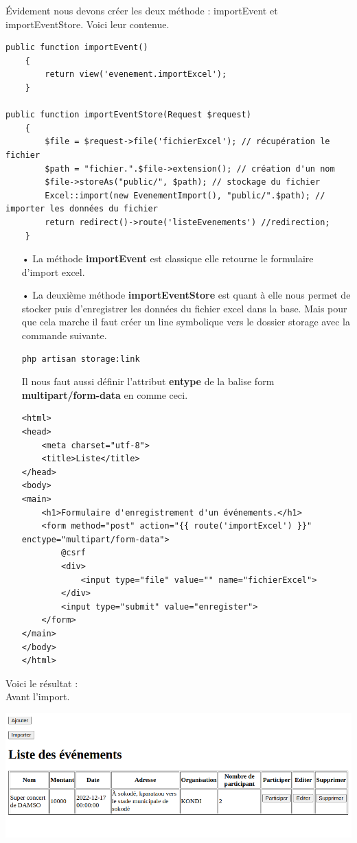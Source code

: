 \documentclass[12pt,a4paper]{article}
\begin{document}
Évidement nous devons créer les deux méthode : importEvent et importEventStore.
Voici leur contenue.
\begin{verbatim}
public function importEvent()
    {
        return view('evenement.importExcel');
    }

public function importEventStore(Request $request)
    {
        $file = $request->file('fichierExcel'); // récupération le fichier
        $path = "fichier.".$file->extension(); // création d'un nom 
        $file->storeAs("public/", $path); // stockage du fichier
        Excel::import(new EvenementImport(), "public/".$path); // importer les données du fichier
        return redirect()->route('listeEvenements') //redirection;
    }
\end{verbatim}
\begin{itemize}
\item[•] La méthode \textbf{importEvent} est classique elle retourne le formulaire
d'import excel.
\item[•] La deuxième méthode \textbf{importEventStore} est quant à elle nous permet de stocker puis d’enregistrer les données du fichier excel dans la base. Mais pour que cela marche il faut créer un line symbolique vers le dossier storage avec la commande suivante.
\begin{verbatim}
php artisan storage:link
\end{verbatim}
Il nous faut aussi définir l'attribut \textbf{entype} de la balise form \textbf{multipart/form-data} en comme ceci.
\begin{verbatim}
<html>
<head>
    <meta charset="utf-8">
    <title>Liste</title>
</head>
<body>
<main>
    <h1>Formulaire d'enregistrement d'un événements.</h1>
    <form method="post" action="{{ route('importExcel') }}" enctype="multipart/form-data">
        @csrf
        <div>
            <input type="file" value="" name="fichierExcel">
        </div>
        <input type="submit" value="enregister">
    </form>
</main>
</body>
</html>
\end{verbatim}
\end{itemize}
Voici le résultat : \\
Avant l'import.
\begin{center}
\includegraphics[scale=0.55]{img/before_import.png}
\end{center}
\end{document}

